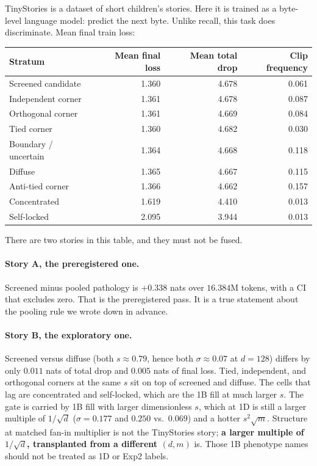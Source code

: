 \documentclass[11pt,a4paper]{report}
\begin{document}
TinyStories is a dataset of short children's stories. Here it is trained as a byte-level language model: predict the next byte. Unlike recall, this task does discriminate. Mean final train loss:

\begin{center}
\begin{tabular}{lrrr}
\toprule
Stratum & Mean final loss & Mean total drop & Clip frequency \\
\midrule
Screened candidate & 1.360 & 4.678 & 0.061 \\
Independent corner & 1.361 & 4.678 & 0.087 \\
Orthogonal corner & 1.361 & 4.669 & 0.084 \\
Tied corner & 1.360 & 4.682 & 0.030 \\
Boundary / uncertain & 1.364 & 4.668 & 0.118 \\
Diffuse & 1.365 & 4.667 & 0.115 \\
Anti-tied corner & 1.366 & 4.662 & 0.157 \\
Concentrated & 1.619 & 4.410 & 0.013 \\
Self-locked & 2.095 & 3.944 & 0.013 \\
\bottomrule
\end{tabular}
\end{center}

There are two stories in this table, and they must not be fused.

\paragraph{Story A, the preregistered one.}
Screened minus pooled pathology is $+0.338$ nats over $16.384$M tokens, with a CI that excludes zero. That is the preregistered pass. It is a true statement about the pooling rule we wrote down in advance.

\paragraph{Story B, the exploratory one.}
Screened versus diffuse (both $s\approx 0.79$, hence both $\sigma\approx 0.07$ at $d=128$) differs by only $0.011$ nats of total drop and $0.005$ nats of final loss. Tied, independent, and orthogonal corners at the same $s$ sit on top of screened and diffuse. The cells that lag are concentrated and self-locked, which are the 1B fill at much larger $s$. The gate is carried by 1B fill with larger dimensionless $s$, which at 1D is still a larger multiple of $1/\sqrt{d}$ ($\sigma=0.177$ and $0.250$ vs.\ $0.069$) and a hotter $s^2\sqrt{m}$. Structure at matched fan-in multiplier is not the TinyStories story; \textbf{a larger multiple of $1/\sqrt{d}$, transplanted from a different $(d,m)$} is. Those 1B phenotype names should not be treated as 1D or Exp2 labels.
\end{document}
